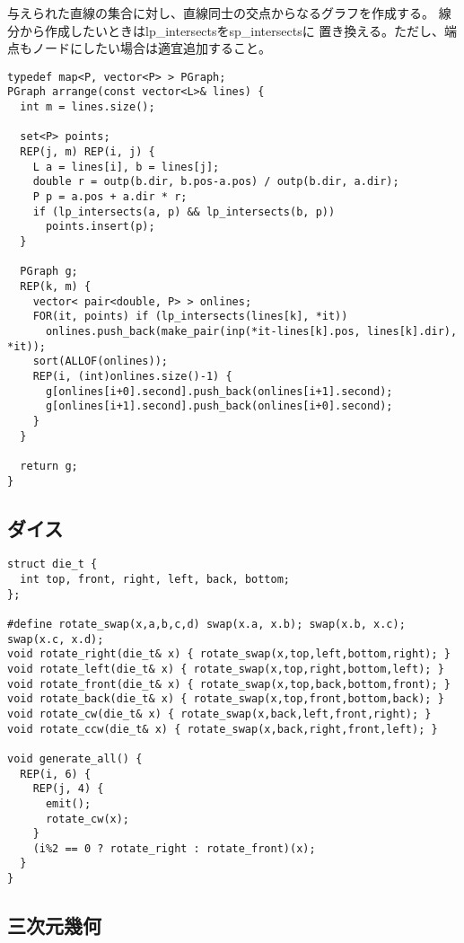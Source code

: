 与えられた直線の集合に対し、直線同士の交点からなるグラフを作成する。
線分から作成したいときはlp\_intersectsをsp\_intersectsに
置き換える。ただし、端点もノードにしたい場合は適宜追加すること。

\begin{lstlisting}
typedef map<P, vector<P> > PGraph;
PGraph arrange(const vector<L>& lines) {
  int m = lines.size();
 
  set<P> points;
  REP(j, m) REP(i, j) {
    L a = lines[i], b = lines[j];
    double r = outp(b.dir, b.pos-a.pos) / outp(b.dir, a.dir);
    P p = a.pos + a.dir * r;
    if (lp_intersects(a, p) && lp_intersects(b, p))
      points.insert(p);
  }
 
  PGraph g;
  REP(k, m) {
    vector< pair<double, P> > onlines;
    FOR(it, points) if (lp_intersects(lines[k], *it))
      onlines.push_back(make_pair(inp(*it-lines[k].pos, lines[k].dir), *it));
    sort(ALLOF(onlines));
    REP(i, (int)onlines.size()-1) {
      g[onlines[i+0].second].push_back(onlines[i+1].second);
      g[onlines[i+1].second].push_back(onlines[i+0].second);
    }
  }
 
  return g;
}
\end{lstlisting}


\subsection{ダイス}

\begin{lstlisting}
struct die_t {
  int top, front, right, left, back, bottom;
};

#define rotate_swap(x,a,b,c,d) swap(x.a, x.b); swap(x.b, x.c); swap(x.c, x.d);
void rotate_right(die_t& x) { rotate_swap(x,top,left,bottom,right); }
void rotate_left(die_t& x) { rotate_swap(x,top,right,bottom,left); }
void rotate_front(die_t& x) { rotate_swap(x,top,back,bottom,front); }
void rotate_back(die_t& x) { rotate_swap(x,top,front,bottom,back); }
void rotate_cw(die_t& x) { rotate_swap(x,back,left,front,right); }
void rotate_ccw(die_t& x) { rotate_swap(x,back,right,front,left); }

void generate_all() {
  REP(i, 6) {
    REP(j, 4) {
      emit();
      rotate_cw(x);
    }
    (i%2 == 0 ? rotate_right : rotate_front)(x);
  }
}
\end{lstlisting}

\subsection{三次元幾何}

